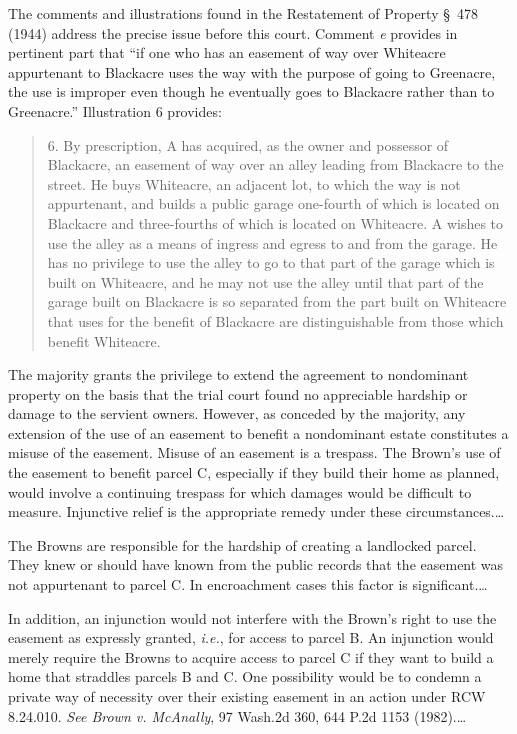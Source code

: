 The comments and illustrations found in the Restatement of Property \S~478
(1944) address the precise issue before this court. Comment \textit{e} provides
in pertinent part that ``if one who has an easement of way over Whiteacre
appurtenant to Blackacre uses the way with the purpose of going to Greenacre,
the use is improper even though he eventually goes to Blackacre rather than to
Greenacre.'' Illustration 6 provides:
\begin{quote}
6. By prescription, A has acquired, as the owner and possessor of Blackacre, an
easement of way over an alley leading from Blackacre to the street. He buys
Whiteacre, an adjacent lot, to which the way is not appurtenant, and builds a
public garage one-fourth of which is located on Blackacre and three-fourths of
which is located on Whiteacre. A wishes to use the alley as a means of ingress
and egress to and from the garage. He has no privilege to use the alley to go to
that part of the garage which is built on Whiteacre, and he may not use the
alley until that part of the garage built on Blackacre is so separated from the
part built on Whiteacre that uses for the benefit of Blackacre are
distinguishable from those which benefit Whiteacre.
\end{quote}
The majority grants the privilege to extend the agreement to nondominant
property on the basis that the trial court found no appreciable hardship or
damage to the servient owners. However, as conceded by the majority, any
extension of the use of an easement to benefit a nondominant estate constitutes
a misuse of the easement. Misuse of an easement is a trespass. The Brown's use
of the easement to benefit parcel C, especially if they build their home as
planned, would involve a continuing trespass for which damages would be
difficult to measure. Injunctive relief is the appropriate remedy under these
circumstances.\ldots

The Browns are responsible for the hardship of creating a landlocked parcel.
They knew or should have known from the public records that the easement was not
appurtenant to parcel C. In encroachment cases this factor is
significant.\dots

In addition, an injunction would not interfere with the Brown's right to use the
easement as expressly granted, \textit{i.e.},  for access to parcel B. An
injunction would merely require the Browns to acquire access to parcel C if they
want to build a home that straddles parcels B and C. One possibility would be to
condemn a private way of necessity over their existing easement in an action
under RCW 8.24.010. \textit{See Brown v. McAnally},  97 Wash.2d 360, 644 P.2d
1153 (1982).\dots

